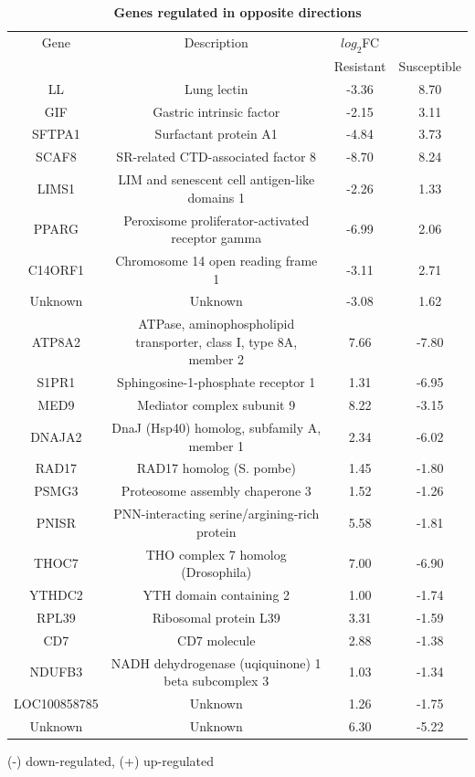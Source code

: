\documentclass[10pt]{article}
\begin{document}
\begin{table}[!ht]
\caption{
\bf{Genes regulated in opposite directions}}
\begin{tabular}{cccc}
        \hline
        Gene & Description & $log_{2}$FC & \\
         & & Resistant & Susceptible\\
        \hline
        LL & Lung lectin & -3.36 & 8.70 \\
        GIF & Gastric intrinsic factor & -2.15 & 3.11 \\
        SFTPA1 & Surfactant protein A1 & -4.84 & 3.73 \\
        SCAF8 & SR-related CTD-associated factor 8 & -8.70 & 8.24 \\
        LIMS1 & LIM and senescent cell antigen-like domains 1 & -2.26 & 1.33 \\
        PPARG & Peroxisome proliferator-activated receptor gamma & -6.99 & 2.06 \\
        C14ORF1 & Chromosome 14 open reading frame 1 & -3.11 & 2.71 \\
        Unknown & Unknown & -3.08 & 1.62 \\
        \hline
        ATP8A2 & ATPase, aminophospholipid transporter, class I, type 8A, member 2 & 7.66 & -7.80 \\
        S1PR1 & Sphingosine-1-phosphate receptor 1 & 1.31 & -6.95 \\
        MED9 & Mediator complex subunit 9 & 8.22 & -3.15 \\
        DNAJA2 & DnaJ (Hsp40) homolog, subfamily A, member 1 & 2.34 & -6.02 \\
        RAD17 & RAD17 homolog (S. pombe) & 1.45 & -1.80 \\
        PSMG3 & Proteosome assembly chaperone 3 & 1.52 & -1.26 \\
        PNISR & PNN-interacting serine/argining-rich protein & 5.58 & -1.81 \\
        THOC7 & THO complex 7 homolog (Drosophila) & 7.00 & -6.90 \\
        YTHDC2 & YTH domain containing 2 & 1.00 & -1.74 \\
        RPL39 & Ribosomal protein L39 & 3.31 & -1.59 \\
        CD7 & CD7 molecule & 2.88 & -1.38 \\
        NDUFB3 & NADH dehydrogenase (uqiquinone) 1 beta subcomplex 3 & 1.03 & -1.34 \\
        LOC100858785 & Unknown & 1.26 & -1.75 \\
        Unknown & Unknown & 6.30 & -5.22 \\
        \hline
    \end{tabular}
    \begin{flushleft}
        (-) down-regulated, (+) up-regulated
    \end{flushleft}
    \label{tab:opposite}
\end{table}
\end{document}
